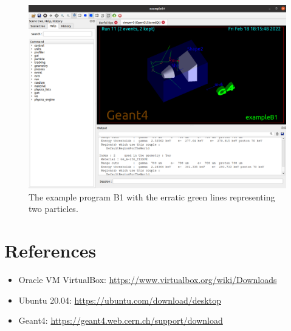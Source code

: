 \documentclass[a4paper,12pt]{extarticle}
\begin{document}
\begin{figure}[H]
    \centering
    \includegraphics[scale=0.5]{geantkep.png}
    \caption{The example program B1 with the erratic green lines representing two particles.}
\end{figure}

\section{References}
\begin{itemize}
    \item Oracle VM VirtualBox: \url{https://www.virtualbox.org/wiki/Downloads}
    \item Ubuntu 20.04: \url{https://ubuntu.com/download/desktop}
    \item Geant4: \url{https://geant4.web.cern.ch/support/download}
\end{itemize}
\end{document}
